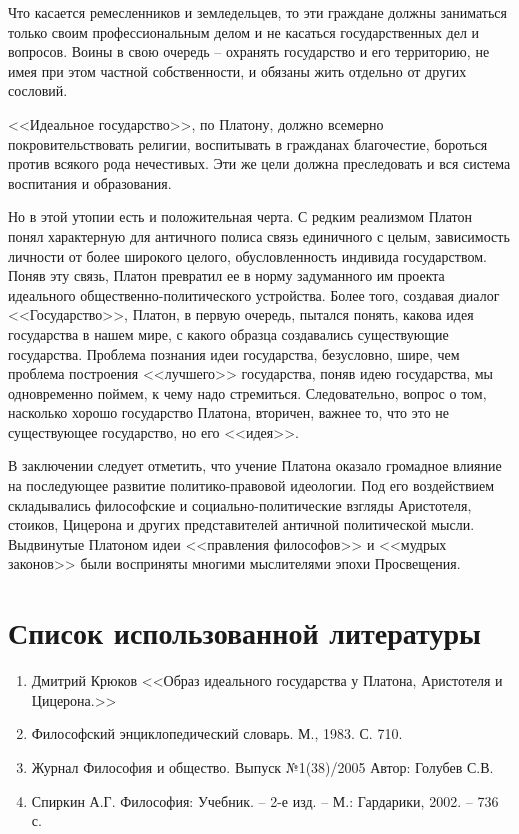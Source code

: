 	Что касается ремесленников и земледельцев, то эти граждане должны 
	заниматься только своим профессиональным делом и не касаться 
	государственных дел и вопросов. Воины в свою очередь – охранять государство 
	и его территорию, не имея при этом частной собственности, и обязаны жить 
	отдельно от других сословий. 

	<<Идеальное государство>>, по Платону, должно всемерно покровительствовать 
	религии, воспитывать в гражданах благочестие, бороться против всякого рода 
	нечестивых. Эти же цели должна преследовать и вся система воспитания и 
	образования.

	Но в этой утопии есть и положительная черта. С редким реализмом Платон 
	понял характерную для античного полиса связь единичного с целым, 
	зависимость личности от более широкого целого, обусловленность индивида 
	государством. Поняв эту связь, Платон превратил ее в норму задуманного 
	им проекта идеального общественно-политического устройства. Более того, 
	создавая диалог <<Государство>>, Платон, в первую очередь, пытался понять, 
	какова идея государства в нашем мире, с какого образца создавались 
	существующие государства. Проблема познания идеи государства, безусловно, 
	шире, чем проблема построения <<лучшего>> государства, поняв идею 
	государства, мы одновременно поймем, к чему надо стремиться. 
	Следовательно, вопрос о том, насколько хорошо государство Платона, 
	вторичен, важнее то, что это не существующее государство, но его <<идея>>.

	В заключении следует отметить, что учение Платона оказало громадное 
	влияние на последующее развитие политико-правовой идеологии. Под его 
	воздействием складывались философские и социально-политические взгляды 
	Аристотеля, стоиков, Цицерона и других представителей античной политической 
	мысли. Выдвинутые Платоном идеи <<правления философов>> и <<мудрых законов>> 
	были восприняты многими мыслителями эпохи Просвещения.

\pagebreak

\chapter{Список использованной литературы}
\begin{enumerate}
	\item Дмитрий Крюков <<Образ идеального государства у Платона, Аристотеля и Цицерона.>>
	\item Философский энциклопедический словарь. М., 1983. С. 710.
	\item Журнал Философия и общество. Выпуск №1(38)/2005 Автор: Голубев С.В.
	\item Спиркин А.Г. Философия: Учебник. – 2-е изд. – М.: Гардарики, 2002. – 736 с.
\end{enumerate}
